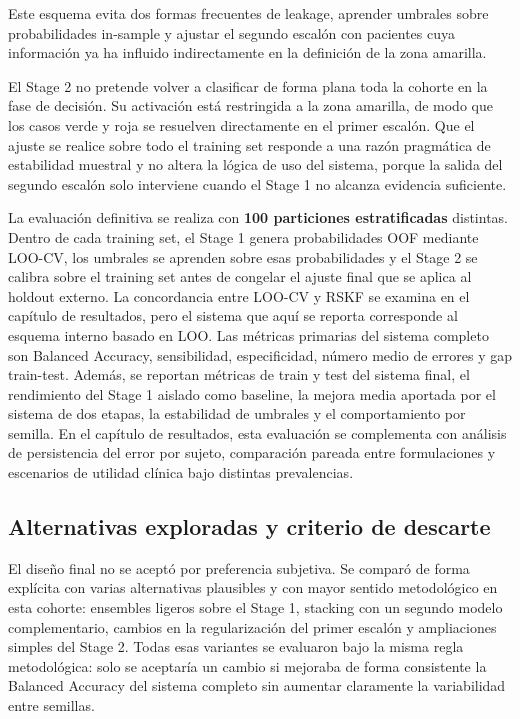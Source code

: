 Este esquema evita dos formas frecuentes de leakage, aprender umbrales sobre probabilidades in-sample y ajustar el
segundo escalón con pacientes cuya información ya ha influido indirectamente en la definición de la zona amarilla.

El Stage 2 no pretende volver a clasificar de forma plana toda la cohorte en la fase de decisión. Su activación está
restringida a la zona amarilla, de modo que los casos verde y roja se resuelven directamente en el primer escalón. Que
el ajuste se realice sobre todo el training set responde a una razón pragmática de estabilidad muestral y no altera la
lógica de uso del sistema, porque la salida del segundo escalón solo interviene cuando el Stage 1 no alcanza evidencia
suficiente.

La evaluación definitiva se realiza con \textbf{100 particiones estratificadas} distintas. Dentro de cada training set,
el Stage 1 genera probabilidades OOF mediante LOO-CV, los umbrales se aprenden sobre esas probabilidades y el Stage 2
se calibra sobre el training set antes de congelar el ajuste final que se aplica al holdout externo. La concordancia
entre LOO-CV y RSKF se examina en el capítulo de resultados, pero el sistema que aquí se reporta corresponde al esquema
interno basado en LOO. Las métricas
primarias del sistema completo son Balanced Accuracy,
sensibilidad, especificidad, número medio de errores y gap train-test. Además, se reportan métricas de train y test del
sistema final, el rendimiento del Stage 1 aislado como baseline, la mejora media aportada por el sistema de dos etapas, la estabilidad
de umbrales y el comportamiento por semilla. En el capítulo de resultados, esta evaluación se complementa con análisis
de persistencia del error por sujeto, comparación pareada entre formulaciones y escenarios de utilidad clínica bajo
distintas prevalencias.

\subsection{Alternativas exploradas y criterio de descarte}

El diseño final no se aceptó por preferencia subjetiva. Se comparó de forma explícita con varias alternativas
plausibles y con mayor sentido metodológico en esta cohorte: ensembles ligeros sobre el Stage 1, stacking con un segundo
modelo complementario, cambios en la regularización del primer escalón y ampliaciones simples del Stage 2. Todas esas
variantes se evaluaron bajo la misma regla metodológica: solo se aceptaría un cambio si
mejoraba de forma consistente la Balanced Accuracy del sistema completo sin aumentar claramente la variabilidad entre
semillas.

